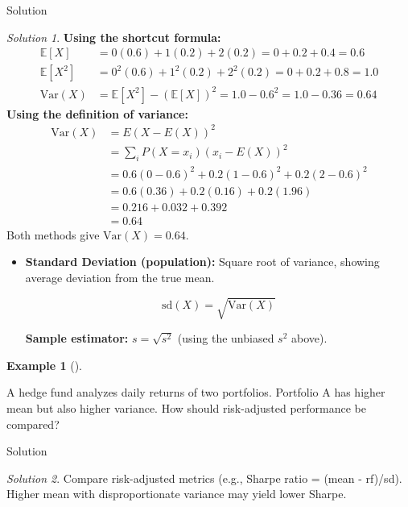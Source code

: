 \documentclass[
  12pt,
  letterpaper,
]{scrbook}
\theoremstyle{plain}
\theoremstyle{definition}
\newtheorem{example}{Example}[chapter]
\theoremstyle{remark}
\newtheorem{refsolution}{Solution}[chapter]
\begin{document}
Solution

\begin{refsolution}
\textbf{Using the shortcut formula:} \[
\begin{split}
\mathbb{E}[X] &= 0(0.6)+1(0.2)+2(0.2)=0+0.2+0.4=0.6 \\
\mathbb{E}[X^2] &= 0^2(0.6)+1^2(0.2)+2^2(0.2)=0+0.2+0.8=1.0 \\
\text{Var}(X) &= \mathbb{E}[X^2] - (\mathbb{E}[X])^2 = 1.0 - 0.6^2 = 1.0 - 0.36 = 0.64
\end{split}
\] \textbf{Using the definition of variance:} \[
\begin{split}
\text{Var}(X) &= E(X-E(X))^2 \\
&= \sum_i P(X=x_i)(x_i-E(X))^2 \\
&= 0.6(0-0.6)^2 + 0.2(1-0.6)^2 + 0.2(2-0.6)^2 \\
&= 0.6(0.36) + 0.2(0.16) + 0.2(1.96) \\
&= 0.216 + 0.032 + 0.392 \\
&= 0.64 
\end{split}
\] Both methods give \(\text{Var}(X)=0.64\).

\label{sol-10}

\end{refsolution}

\begin{itemize}
\item
  \textbf{Standard Deviation (population):} Square root of variance,
  showing average deviation from the true mean.

  \[\text{sd}(X) = \sqrt{\text{Var}(X)}\]

  \textbf{Sample estimator:} \(s = \sqrt{s^2}\) (using the unbiased
  \(s^2\) above).
\end{itemize}

\begin{example}[]\protect\hypertarget{exm-9}{}\label{exm-9}

A hedge fund analyzes daily returns of two portfolios. Portfolio A has
higher mean but also higher variance. How should risk-adjusted
performance be compared?

\end{example}

Solution

\begin{refsolution}
\leavevmode

Compare risk-adjusted metrics (e.g., Sharpe ratio = (mean - rf)/sd).
Higher mean with disproportionate variance may yield lower Sharpe.

\label{sol-9}

\end{refsolution}
\end{document}
